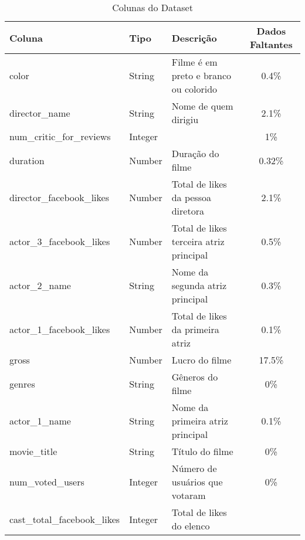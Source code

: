 \begin{longtable}{|l|l|L|c|}
\caption{ Colunas do Dataset }
\\ \hline
\textbf{Coluna}              & \textbf{Tipo} & \textbf{Descrição}                      & \textbf{Dados Faltantes} \\ \hline
color                        & String        & Filme é em preto e branco ou colorido   & 0.4\%                    \\ \hline
director\_name               & String        & Nome de quem dirigiu                    & 2.1\%                    \\ \hline
num\_critic\_for\_reviews    & Integer       &                                         & 1\%                      \\ \hline
duration                     & Number        & Duração do filme                        & 0.32\%                   \\ \hline
director\_facebook\_likes    & Number        & Total de likes da pessoa diretora       & 2.1\%                    \\ \hline
actor\_3\_facebook\_likes    & Number        & Total de likes terceira atriz principal & 0.5\%                    \\ \hline
actor\_2\_name               & String        & Nome da segunda atriz principal         & 0.3\%                    \\ \hline
actor\_1\_facebook\_likes    & Number        & Total de likes da primeira atriz        & 0.1\%                    \\ \hline
gross                        & Number        & Lucro do filme                          & 17.5\%                   \\ \hline
genres                       & String        & Gêneros do filme                        & 0\%                      \\ \hline
actor\_1\_name               & String        & Nome da primeira atriz principal        & 0.1\%                    \\ \hline
movie\_title                 & String        & Título do filme                         & 0\%                      \\ \hline
num\_voted\_users            & Integer       & Número de usuários que votaram          & 0\%                      \\ \hline
cast\_total\_facebook\_likes & Integer       & Total de likes do elenco                &                          \\ \hline

\end{longtable}
